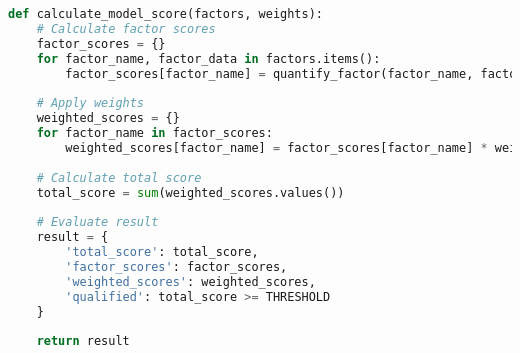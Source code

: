 \documentclass[12pt,a4paper]{article}
\begin{document}
\begin{lstlisting}[language=Python, caption={Model Implementation Example}]
def calculate_model_score(factors, weights):
    # Calculate factor scores
    factor_scores = {}
    for factor_name, factor_data in factors.items():
        factor_scores[factor_name] = quantify_factor(factor_name, factor_data)
    
    # Apply weights
    weighted_scores = {}
    for factor_name in factor_scores:
        weighted_scores[factor_name] = factor_scores[factor_name] * weights[factor_name]
    
    # Calculate total score
    total_score = sum(weighted_scores.values())
    
    # Evaluate result
    result = {
        'total_score': total_score,
        'factor_scores': factor_scores,
        'weighted_scores': weighted_scores,
        'qualified': total_score >= THRESHOLD
    }
    
    return result
\end{lstlisting}
\end{document}
